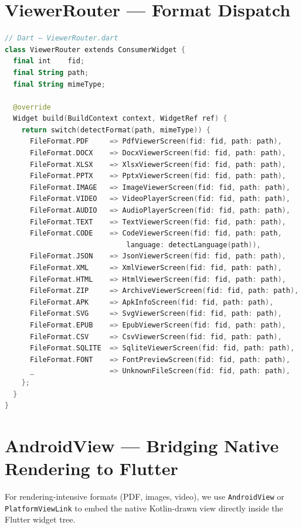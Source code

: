 \documentclass[12pt,a4paper]{report}
\begin{document}
\section{ViewerRouter — Format Dispatch}

\begin{lstlisting}[language=Kotlin,caption={ViewerRouter.dart — format-based screen dispatch}]
// Dart — ViewerRouter.dart
class ViewerRouter extends ConsumerWidget {
  final int    fid;
  final String path;
  final String mimeType;

  @override
  Widget build(BuildContext context, WidgetRef ref) {
    return switch(detectFormat(path, mimeType)) {
      FileFormat.PDF     => PdfViewerScreen(fid: fid, path: path),
      FileFormat.DOCX    => DocxViewerScreen(fid: fid, path: path),
      FileFormat.XLSX    => XlsxViewerScreen(fid: fid, path: path),
      FileFormat.PPTX    => PptxViewerScreen(fid: fid, path: path),
      FileFormat.IMAGE   => ImageViewerScreen(fid: fid, path: path),
      FileFormat.VIDEO   => VideoPlayerScreen(fid: fid, path: path),
      FileFormat.AUDIO   => AudioPlayerScreen(fid: fid, path: path),
      FileFormat.TEXT    => TextViewerScreen(fid: fid, path: path),
      FileFormat.CODE    => CodeViewerScreen(fid: fid, path: path,
                             language: detectLanguage(path)),
      FileFormat.JSON    => JsonViewerScreen(fid: fid, path: path),
      FileFormat.XML     => XmlViewerScreen(fid: fid, path: path),
      FileFormat.HTML    => HtmlViewerScreen(fid: fid, path: path),
      FileFormat.ZIP     => ArchiveViewerScreen(fid: fid, path: path),
      FileFormat.APK     => ApkInfoScreen(fid: fid, path: path),
      FileFormat.SVG     => SvgViewerScreen(fid: fid, path: path),
      FileFormat.EPUB    => EpubViewerScreen(fid: fid, path: path),
      FileFormat.CSV     => CsvViewerScreen(fid: fid, path: path),
      FileFormat.SQLITE  => SqliteViewerScreen(fid: fid, path: path),
      FileFormat.FONT    => FontPreviewScreen(fid: fid, path: path),
      _                  => UnknownFileScreen(fid: fid, path: path),
    };
  }
}
\end{lstlisting}

\section{AndroidView — Bridging Native Rendering to Flutter}

For rendering-intensive formats (PDF, images, video), we use
\texttt{AndroidView} or \texttt{PlatformViewLink} to embed the native
Kotlin-drawn view directly inside the Flutter widget tree.
\end{document}
